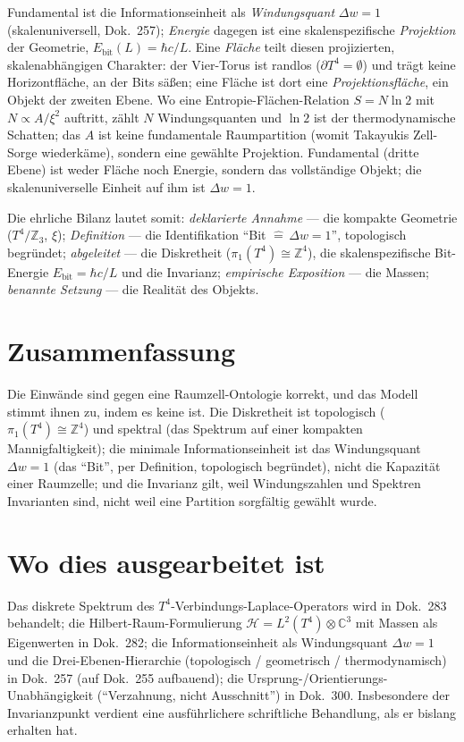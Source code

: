 Fundamental ist die Informationseinheit als \emph{Windungsquant} $\Delta w = 1$
(skalenuniversell, Dok.~257); \emph{Energie} dagegen ist eine skalenspezifische
\emph{Projektion} der Geometrie, $E_\text{bit}(L) = \hbar c / L$. Eine \emph{Fläche}
teilt diesen projizierten, skalenabhängigen Charakter: der Vier-Torus ist randlos
($\partial T^4 = \emptyset$) und trägt keine Horizontfläche, an der Bits säßen; eine
Fläche ist dort eine \emph{Projektionsfläche}, ein Objekt der zweiten Ebene. Wo eine
Entropie-Flächen-Relation $S = N\ln 2$ mit $N \propto A/\xi^2$ auftritt, zählt $N$
Windungsquanten und $\ln 2$ ist der thermodynamische Schatten; das $A$ ist keine
fundamentale Raumpartition (womit Takayukis Zell-Sorge wiederkäme), sondern eine
gewählte Projektion. Fundamental (dritte Ebene) ist weder Fläche noch Energie, sondern
das vollständige Objekt; die skalenuniverselle Einheit auf ihm ist $\Delta w = 1$.

Die ehrliche Bilanz lautet somit: \emph{deklarierte Annahme} --- die kompakte Geometrie
($T^4/\mathbb{Z}_3$, $\xi$); \emph{Definition} --- die Identifikation \enquote{Bit
$\widehat{=}\,\Delta w = 1$}, topologisch begründet; \emph{abgeleitet} --- die
Diskretheit ($\pi_1(T^4)\cong\mathbb{Z}^4$), die skalenspezifische Bit-Energie
$E_\text{bit} = \hbar c/L$ und die Invarianz; \emph{empirische Exposition} --- die
Massen; \emph{benannte Setzung} --- die Realität des Objekts.

\section{Zusammenfassung}

Die Einwände sind gegen eine Raumzell-Ontologie korrekt, und das Modell stimmt ihnen
zu, indem es keine ist. Die Diskretheit ist topologisch ($\pi_1(T^4)\cong\mathbb{Z}^4$)
und spektral (das Spektrum auf einer kompakten Mannigfaltigkeit); die minimale
Informationseinheit ist das Windungsquant $\Delta w = 1$ (das \enquote{Bit}, per
Definition, topologisch begründet), nicht die Kapazität einer Raumzelle; und die
Invarianz gilt, weil Windungszahlen und Spektren Invarianten sind, nicht weil eine
Partition sorgfältig gewählt wurde.

\section{Wo dies ausgearbeitet ist}

Das diskrete Spektrum des $T^4$-Verbindungs-Laplace-Operators wird in Dok.~283
behandelt; die Hilbert-Raum-Formulierung $\mathcal{H}=L^2(T^4)\otimes\mathbb{C}^3$ mit
Massen als Eigenwerten in Dok.~282; die Informationseinheit als Windungsquant
$\Delta w = 1$ und die Drei-Ebenen-Hierarchie (topologisch / geometrisch /
thermodynamisch) in Dok.~257 (auf Dok.~255 aufbauend); die Ursprung-/Orientierungs-Un\-abhängigkeit
(\enquote{Verzahnung, nicht Ausschnitt}) in Dok.~300. Insbesondere der Invarianzpunkt
verdient eine ausführlichere schriftliche Behandlung, als er bislang erhalten hat.

